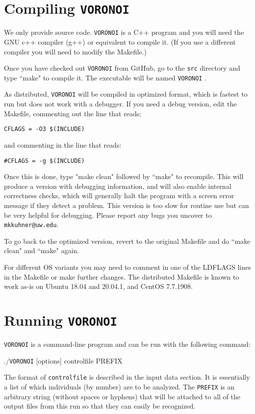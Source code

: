\documentclass[10pt,titlepage,times,letterpaper]{article}
\def\VORONOI{{\tt VORONOI} }
\begin{document}
\section{Compiling \VORONOI}

We only provide source code.  \VORONOI is a C++ program and you will need the
GNU c++ compiler (g++) or equivalent to compile it.  (If you use a different
compiler you will need to modify the Makefile.)

Once you have checked out \VORONOI from GitHub, go to the {\tt src} directory
and type ``make" to compile it.  The executable will be named \VORONOI.

As distributed, \VORONOI will be compiled in optimized format, which is
fastest to run but does not work with a debugger.  If you need a debug
version, edit the Makefile, commenting out the line that reads:

{\tt CFLAGS = -O3 \$(INCLUDE)}

and commenting in the line that reads:

{\tt \#CFLAGS = -g \$(INCLUDE)}

Once this is done, type "make clean" followed by ``make" to recompile.  
This will produce a version with debugging information, and will also
enable internal correctness checks, which will generally
halt the program with a screen error message if they detect a problem.  
This version is too slow for routine use but can be very helpful for debugging.
Please report any bugs you uncover to {\tt mkkuhner@uw.edu}.

To go back to the optimized version, revert to the original Makefile
and do ``make clean" and ``make" again.

For different OS variants you may need to comment in one of 
the LDFLAGS lines in the Makefile or make further changes.  The 
distributed Makefile is known to work as-is on Ubuntu 18.04 and 
20.04.1, and CentOS 7.7.1908.  


\section{Running \VORONOI}

\VORONOI is a command-line program and can be run with the following command:

./\VORONOI [options] controlfile PREFIX

The format of {\tt controlfile} is described in the input data section.  It is essentially a list
of which individuals (by number) are to be analyzed.  The {\tt PREFIX} is an arbitrary string (without
spaces or hyphens) that will be attached to all of the output files from this run so that they can
easily be recognized.
\end{document}
